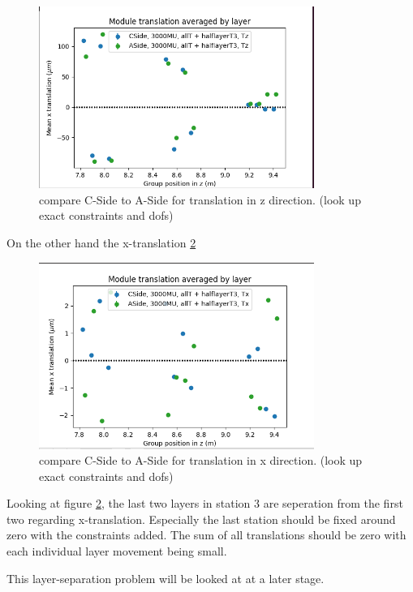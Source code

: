 \begin{figure}
  \centering
  \includegraphics[width=0.8\textwidth]{plots/june_21/CA_allT_halfT3_Tz.png}
  \caption{compare C-Side to A-Side for translation in z direction. (look up exact constraints and dofs)}
  \label{fig:june_5}
\end{figure}

On the other hand the x-translation \ref{fig:june_6}

\begin{figure}
  \centering
  \includegraphics[width=0.8\textwidth]{plots/june_21/CA_allT_halfT3_Tx.png}
  \caption{compare C-Side to A-Side for translation in x direction. (look up exact constraints and dofs)}
  \label{fig:june_6}
\end{figure}

Looking at figure \ref{fig:june_6}, the last two layers in station 3 are
seperation from the first two regarding x-translation. Especially the last
station should be fixed around zero with the constraints added. The sum of
all translations should be zero with each individual layer movement being small.

This layer-separation problem will be looked at at a later stage.

